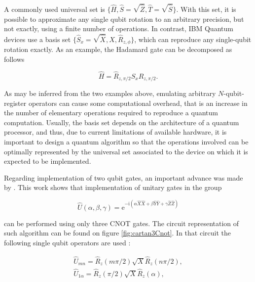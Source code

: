     

    A commonly used universal set is $\{\hat{H}, \hat{S} = \sqrt{\hat{Z}}, \hat{T} = \sqrt{\hat{S}}\}$. With this set, it is possible to approximate any single qubit rotation to an arbitrary precision, but not exactly, using a finite number of operations. In contrast, IBM Quantum devices use a basis set $\{\hat{S}_x = \sqrt{\hat{X}}, \hat{X}, \hat{R}_{z,\phi} \}$, which can reproduce any single-qubit rotation exactly. As an example, the Hadamard gate can be decomposed as follows

    \begin{equation}
      \hat{H} = \hat{R}_{z,\pi/2} \hat{S}_x \hat{R}_{z,\pi/2}.
      \label{eq:hadamard-decomp}
    \end{equation}

    As may be inferred from the two examples above, emulating arbitrary $N$-qubit-register operators can cause some computational overhead, that is an increase in the number of elementary operations required to reproduce a quantum computation. Usually, the basis set depends on the architecture of a quantum processor, and thus, due to current limitations of available hardware, it is important to design a quantum algorithm so that the operations involved can be optimally represented by the universal set associated to the device on which it is expected to be implemented.

    Regarding implementation of two qubit gates, an important advance was made by \cite{BellUniversalCartan}. This work shows that implementation of unitary gates in the group
    
    \begin{equation}
      \hat{U}(\alpha, \beta, \gamma) = \mathrm{e}^{-\mathrm{i}(\alpha\hat{X}\hat{X} + \beta\hat{Y}\hat{Y} + \gamma\hat{Z}\hat{Z})}
      \label{eq:CartanDecomp}
    \end{equation}

    \noindent can be performed using only three CNOT gates. The circuit representation of such algorithm can be found on figure \ref{fig:cartan3Cnot}. In that circuit the following single qubit operators are used \cite{RXZPulseEfficient}:

    \begin{gather}
      \hat{U}_{mn} = \hat{R}_{z}(m\pi/2)\sqrt{X}\hat{R}_{z}(n\pi/2), \\
      \hat{U}_{1\alpha} = \hat{R}_{z}(\pi/2)\sqrt{X}\hat{R}_{z}(\alpha),
      \label{eq:AuxUnitaryCartan}
    \end{gather}

